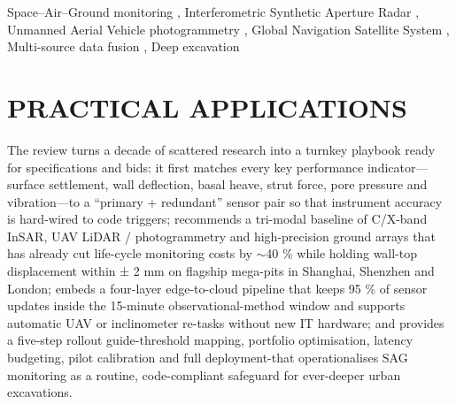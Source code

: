 \documentclass[preprint,11pt,authoryear,3p]{elsarticle}
\begin{document}
\begin{frontmatter}
\begin{abstract}
\end{abstract}


\begin{keyword}


Space--Air--Ground monitoring \sep
Interferometric Synthetic Aperture Radar  \sep
Unmanned Aerial Vehicle photogrammetry \sep
Global Navigation Satellite System \sep
Multi-source data fusion \sep
Deep excavation
\end{keyword}

\end{frontmatter}

\section*{PRACTICAL APPLICATIONS}

The review turns a decade of scattered research into a turnkey playbook ready for specifications and bids: it first matches every key performance indicator—surface settlement, wall deflection, basal heave, strut force, pore pressure and vibration—to a “primary + redundant” sensor pair so that instrument accuracy is hard-wired to code triggers; recommends a tri-modal baseline of C/X-band InSAR, UAV LiDAR / photogrammetry and high-precision ground arrays that has already cut life-cycle monitoring costs by $\sim$40 \% while holding wall-top displacement within ± 2 mm on flagship mega-pits in Shanghai, Shenzhen and London; embeds a four-layer edge-to-cloud pipeline that keeps 95 \% of sensor updates inside the 15-minute observational-method window and supports automatic UAV or inclinometer re-tasks without new IT hardware; and provides a five-step rollout guide-threshold mapping, portfolio optimisation, latency budgeting, pilot calibration and full deployment-that operationalises SAG monitoring as a routine, code-compliant safeguard for ever-deeper urban excavations.
\end{document}
